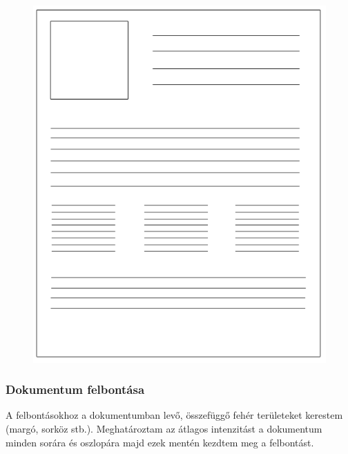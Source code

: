 \documentclass{beamer}
\begin{document}
\begin{frame}[fragile]
\begin{figure}[!tbp]
\begin{minipage}[b]{0.45\textwidth}
    \includegraphics[width=\textwidth]{images/page_complicated.png}
  \end{minipage}
\end{figure}

\end{frame}

\begin{frame}[fragile]
\frametitle{Dokumentum felbontása}

A felbontásokhoz a dokumentumban levő, összefüggő fehér területeket kerestem (margó, sorköz stb.). Meghatároztam az átlagos intenzitást a dokumentum minden sorára és oszlopára majd ezek mentén kezdtem meg a felbontást.

\end{frame}
\end{document}
